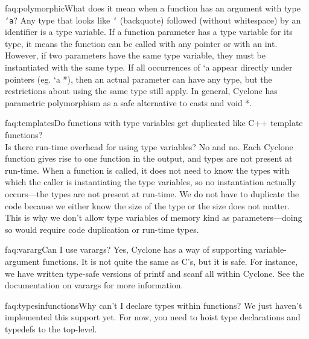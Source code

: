 \begin{faqa}{faq:polymorphic}{What does it mean when a function has an argument with type \texttt{`a}?}
Any type that looks like \texttt{`} (backquote) followed (without
whitespace) by an identifier is a type variable.  If a function
parameter has a type variable for its type, it means the function can
be called with any pointer or with an int.  However, if two parameters
have the same type variable, they must be instantiated with the same
type. If all occurrences of `a appear directly under pointers (eg. `a
*), then an actual parameter can have any type, but the restrictions
about using the same type still apply.  In general, Cyclone has
parametric polymorphism as a safe alternative to casts and void *.
\end{faqa}

\begin{faqa}{faq:templates}{Do functions with type variables get duplicated like C++ template functions?\\  Is there run-time overhead for using type variables?}
No and no.  Each Cyclone function gives rise to one function in the
output, and types are not present at run-time.  When a function is
called, it does not need to know the types with which the caller is
instantiating the type variables, so no instantiation actually
occurs---the types are not present at run-time.  We do not have to
duplicate the code because we either know the size of the type or the
size does not matter.  This is why we don't allow type variables of
memory kind as parameters---doing so would require code duplication or
run-time types.
\end{faqa}

\begin{faqa}{faq:vararg}{Can I use varargs?}
Yes, Cyclone has a way of supporting variable-argument functions.  It
is not quite the same as C's, but it is safe.  For instance, we have
written type-safe versions of printf and scanf all within Cyclone.
See the documentation on varargs for more information.
\end{faqa}

\begin{faqa}{faq:typesinfunctions}{Why can't I declare types within functions?}
We just haven't implemented this support yet.  For now, you need to
hoist type declarations and typedefs to the top-level.
\end{faqa}

